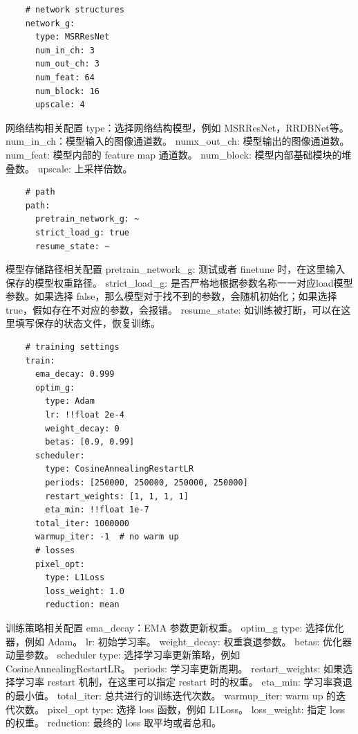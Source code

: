 \documentclass[../main.tex]{subfiles}
\begin{document}
    \begin{verbatim}
    # network structures
    network_g:
      type: MSRResNet
      num_in_ch: 3
      num_out_ch: 3
      num_feat: 64
      num_block: 16
      upscale: 4
    \end{verbatim}
    \begin{exampleBox}[righthand ratio=0.00, sidebyside, sidebyside align=center, lower separated=false]{网络结构相关配置}
    type：选择网络结构模型，例如 MSRResNet，RRDBNet等。
    num\_in\_ch：模型输入的图像通道数。
    numx\_out\_ch: 模型输出的图像通道数。
    num\_feat: 模型内部的 feature map 通道数。
    num\_block: 模型内部基础模块的堆叠数。
    upscale: 上采样倍数。
    \end{exampleBox}
    \begin{verbatim}
    # path
    path:
      pretrain_network_g: ~
      strict_load_g: true
      resume_state: ~
    \end{verbatim}
    \begin{exampleBox}[righthand ratio=0.00, sidebyside, sidebyside align=center, lower separated=false]{模型存储路径相关配置}
    pretrain\_network\_g: 测试或者 finetune 时，在这里输入保存的模型权重路径。
    strict\_load\_g: 是否严格地根据参数名称一一对应load模型参数。如果选择 false，那么模型对于找不到的参数，会随机初始化；如果选择 true，假如存在不对应的参数，会报错。
    resume\_state: 如训练被打断，可以在这里填写保存的状态文件，恢复训练。
    \end{exampleBox}
    \begin{verbatim}
    # training settings
    train:
      ema_decay: 0.999
      optim_g:
        type: Adam
        lr: !!float 2e-4
        weight_decay: 0
        betas: [0.9, 0.99]
      scheduler:
        type: CosineAnnealingRestartLR
        periods: [250000, 250000, 250000, 250000]
        restart_weights: [1, 1, 1, 1]
        eta_min: !!float 1e-7
      total_iter: 1000000
      warmup_iter: -1  # no warm up
      # losses
      pixel_opt:
        type: L1Loss
        loss_weight: 1.0
        reduction: mean
    \end{verbatim}
    \begin{exampleBox}[righthand ratio=0.00, sidebyside, sidebyside align=center, lower separated=false]{训练策略相关配置}
    ema\_decay：EMA 参数更新权重。
    optim\_g type: 选择优化器，例如 Adam。
    lr: 初始学习率。
    weight\_decay: 权重衰退参数。
    betas: 优化器动量参数。
    scheduler type: 选择学习率更新策略，例如 CosineAnnealingRestartLR。
    periods: 学习率更新周期。
    restart\_weights: 如果选择学习率 restart 机制，在这里可以指定 restart 时的权重。
    eta\_min: 学习率衰退的最小值。
    total\_iter: 总共进行的训练迭代次数。
    warmup\_iter: warm up 的迭代次数。
    pixel\_opt type: 选择 loss 函数，例如 L1Loss。
    loss\_weight: 指定 loss 的权重。
    reduction: 最终的 loss 取平均或者总和。
    \end{exampleBox}
\end{document}
